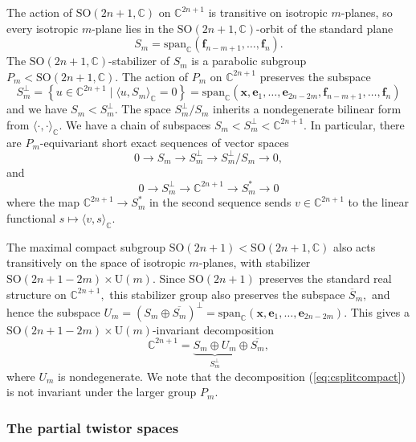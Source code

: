 \documentclass[11pt]{article}
\theoremstyle{definition}
\newcommand{\C}{\mathbb{C}}
\newcommand{\SO}{\mathrm{SO}}
\newcommand{\U}{\mathrm{U}}
\numberwithin{equation}{section}
\begin{document}
\indent The action of $\SO(2n+1, \C)$ on $\C^{2n+1}$ is transitive on isotropic $m$-planes, so every isotropic $m$-plane lies in the $\SO(2n+1, \C)$-orbit of the standard plane
\begin{equation*}
	S_m = \mathrm{span}_\C(\mathbf{f}_{n-m+1}, \ldots, \mathbf{f}_n).
\end{equation*}
The $\SO(2n+1, \C)$-stabilizer of $S_m$ is a parabolic subgroup $P_m < \SO(2n+1, \C).$ The action of $P_m$ on $\C^{2n+1}$ preserves the subspace
\begin{equation*}
	S_m^\perp = \left\lbrace u \in \C^{2n+1} \mid \langle u, S_m \rangle_\C = 0 \right\rbrace = \mathrm{span}_\C(\mathbf{x}, \mathbf{e}_1, \ldots, \mathbf{e}_{2n-2m}, \mathbf{f}_{n-m+1}, \ldots, \mathbf{f}_n)
\end{equation*}
and we have $S_m < S_m^{\perp}.$ The space $S_m^{\perp}/S_m$ inherits a nondegenerate bilinear form from $\langle \cdot, \cdot \rangle_\C.$ We have a chain of subspaces $S_m < S_m^{\perp} < \C^{2n+1}.$ In particular, there are $P_m$-equivariant short exact sequences of vector spaces
\begin{equation*}
	0 \to S_m \to S_m^\perp \to S_m^{\perp}/S_m \to 0,
\end{equation*}
and
\begin{equation*}
	0 \to S_m^{\perp} \to \C^{2n+1} \to S_m^* \to 0
\end{equation*}
where the map $\C^{2n+1} \to S_m^*$ in the second sequence sends $v \in \C^{2n+1}$ to the linear functional $s \mapsto \langle v, s \rangle_\C.$

The maximal compact subgroup $\SO(2n+1) < \SO(2n+1,\C)$ also acts transitively on the space of isotropic $m$-planes, with stabilizer $\SO(2n+1-2m) \times \U(m).$ Since $\SO(2n+1)$ preserves the standard real structure on $\C^{2n+1},$ this stabilizer group also preserves the subspace $\overline{S}_m,$ and hence the subspace $U_m = \left( S_m \oplus \overline{S_m} \right)^\perp = \mathrm{span}_\C(\mathbf{x}, \mathbf{e}_1, \ldots, \mathbf{e}_{2n-2m})$. This gives a $\SO(2n+1-2m) \times \U(m)$-invariant decomposition
\begin{equation}\label{eq:csplitcompact}
	\C^{2n+1} = \underbrace{S_m \oplus U_m}_{S_m^\perp} \oplus \overline{S_m},
\end{equation}
where $U_m$ is nondegenerate. We note that the decomposition (\ref{eq:csplitcompact}) is not invariant under the larger group $P_m.$
    
\subsubsection{The partial twistor spaces}
    
\end{document}
